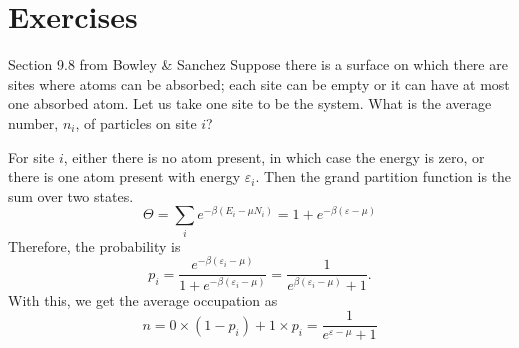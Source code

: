    \section{Exercises}
        \begin{eocproblem*}{Section 9.8 from Bowley \& Sanchez}
            Suppose there is a surface on which there are sites where atoms can be absorbed; each site can be empty or it can have at most one absorbed atom. Let us take one site to be the system. What is the average number, $n_i$, of particles on site $i$?
        \end{eocproblem*}
        For site $i$, either there is no atom present, in which case the energy is zero, or there is one atom present with energy $\varepsilon_i$. Then the grand partition function is the sum over two states. 
        \begin{equation}
            \Theta = \sum_ie^{-\beta(E_i-\mu N_i)} = 1 + e^{-\beta(\varepsilon-\mu)}
        \end{equation}
        Therefore, the probability is
        \begin{equation}
            p_i = \frac{e^{-\beta(\varepsilon_i-\mu)}}{1+e^{-\beta(\varepsilon_i-\mu)}} = \frac{1}{e^{\beta(\varepsilon_i-\mu)}+1}.
        \end{equation}
        With this, we get the average occupation as
        \begin{equation}
            n = 0\times(1-p_i)+1\times p_i = \frac{1}{e^{\varepsilon-\mu}+1}
        \end{equation}